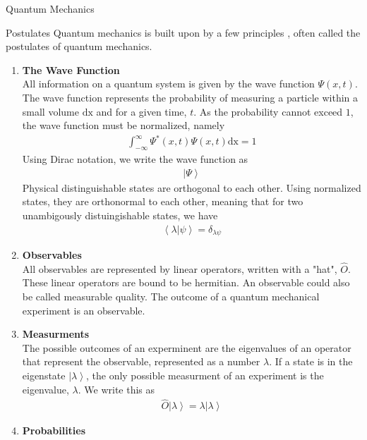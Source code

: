 \documentclass[twoside,english]{uiofysmaster}
\begin{document}
\begin{chapter}{Quantum Mechanics}
 	
	\begin{section}{Postulates}
 		Quantum mechanics is built upon by a few principles \cite{Audun,Griffiths,Sakurai,Susskind2014}, often called the postulates of quantum mechanics. 
 		\begin{enumerate}
 			\item \textbf{The Wave Function} \\
 			All information on a quantum system is given by the wave function $\Psi(x,t) $. The wave function represents the probability of measuring a particle within a small volume $\text{dx}$ and for a given time, $t$. As the probability cannot exceed $1$, the wave function must be normalized, namely
 			\begin{align}
 				\int_{-\infty}^\infty \Psi^*(x,t) \Psi(x,t) \text{dx} = 1
 			\end{align}
 			Using Dirac notation, we write the wave function as
 			\begin{align}
 				\left| \Psi \right>
 			\end{align}
 			Physical distinguishable states are orthogonal to each other. Using normalized states, they are orthonormal to each other, meaning that for two unambigously distuingishable states, we have
 			\begin{align}
 				\left< \lambda | \psi \right> = \delta_{\lambda \psi}
 			\end{align}
 			\item \textbf{Observables}\\
			All observables are represented by linear operators, written with a "hat", $\hat O$. These linear operators are bound to be hermitian. An observable could also be called measurable quality. The outcome of a quantum mechanical experiment is an observable. 
			\item \textbf{Measurments}\\
			The possible outcomes of an experminent are the eigenvalues of an operator that represent the observable, represented as a number $\lambda$. If a state is in the eigenstate $\left| \lambda \right>$, the only possible measurment of an experiment is the eigenvalue, $\lambda$. We write this as
 			\begin{align}
 				\hat O \left| \lambda \right> = \lambda \left| \lambda \right>
 			\end{align}
 			\item \textbf{Probabilities}\\

\end{enumerate}
\end{section}
\end{chapter}
\end{document}
